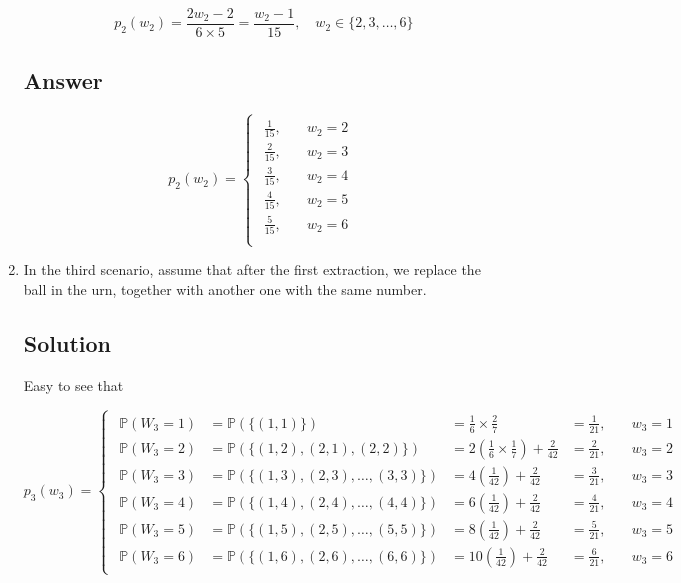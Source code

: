 \documentclass[12pt]{article}
\newcommand{\bP}{\mathbb{P}}
\begin{document}
\begin{enumerate}[start=1,label={\bfseries Part \arabic*:},leftmargin=0in]
			\[p_2(w_2) = \frac{2w_2-2}{6\times 5} = \frac{w_2-1}{15},\quad w_2\in \{2,3,\dots,6\}\]
		
		\subsection*{Answer}
		
			\[\boxed{p_2(w_2) =
				\begin{cases}
					\begin{aligned}
						\frac{1}{15},&\quad w_2 = 2\\
						\frac{2}{15},&\quad w_2 = 3\\
						\frac{3}{15},&\quad w_2 = 4\\
						\frac{4}{15},&\quad w_2 = 5\\
						\frac{5}{15},&\quad w_2 = 6\\
					\end{aligned}
			\end{cases}}\]
			
		\bigskip\item In the third scenario, assume that after the first extraction, we replace the ball in the urn, together with another one with the same number.
		
		\subsection*{Solution}
		
			Easy to see that
			
			\[
			p_3(w_3) =
			\begin{cases}
				\begin{aligned}
					\bP(W_3 = 1) &= \bP(\{(1,1)\}) &= \frac{1}{6}\times \frac{2}{7} &= \frac{1}{21},&\quad w_3 = 1\\
					\bP(W_3 = 2) &= \bP(\{(1,2),(2,1),(2,2)\}) &= 2\left(\frac{1}{6}\times \frac{1}{7}\right) + \frac{2}{42} &= \frac{2}{21},&\quad w_3 = 2\\
					\bP(W_3 = 3) &= \bP(\{(1,3),(2,3),\dots,(3,3)\}) &= 4\left(\frac{1}{42}\right) + \frac{2}{42} &= \frac{3}{21},&\quad w_3 = 3\\
					\bP(W_3 = 4) &= \bP(\{(1,4),(2,4),\dots,(4,4)\}) &= 6\left(\frac{1}{42}\right) + \frac{2}{42} &= \frac{4}{21},&\quad w_3 = 4\\
					\bP(W_3 = 5) &= \bP(\{(1,5),(2,5),\dots,(5,5)\}) &= 8\left(\frac{1}{42}\right) + \frac{2}{42} &= \frac{5}{21},&\quad w_3 = 5\\
					\bP(W_3 = 6) &= \bP(\{(1,6),(2,6),\dots,(6,6)\}) &= 10\left(\frac{1}{42}\right) + \frac{2}{42} &= \frac{6}{21},&\quad w_3 = 6
				\end{aligned}
			\end{cases}
			\]
			

\end{enumerate}
\end{document}
